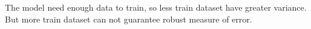 \documentclass{article}
\begin{document}
The model need enough data to train, so less train dataset have greater variance. But more train dataset can not guarantee robust measure of error.

\begin{figure}[!h]
\quad
{}
\quad
{}
\end{figure}
\end{document}
